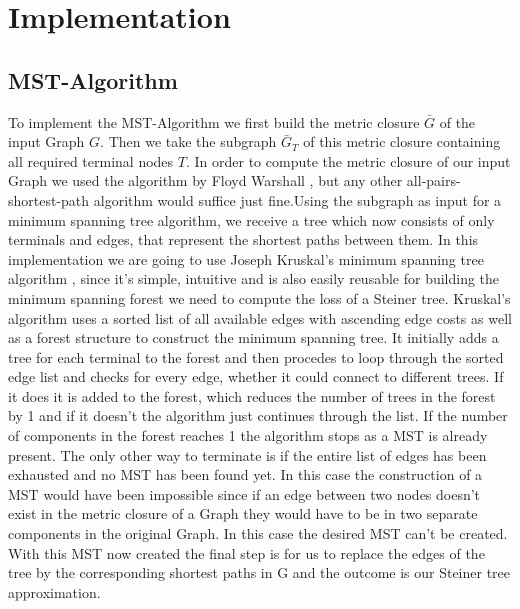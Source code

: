 
\chapter{Implementation}\label{chapter:implementation}



\section{MST-Algorithm}

To implement the MST-Algorithm we first build the metric closure $\bar{G}$ of the input Graph $G$. Then we take the subgraph $\bar{G}_T$ of this metric closure containing all required terminal nodes $T$. In order to compute the metric closure of our input Graph we used the algorithm by Floyd Warshall \cite{hougardy2010floyd}, but any other all-pairs-shortest-path algorithm would suffice just fine.Using the subgraph as input for a minimum spanning tree algorithm, we receive a tree which now consists of only terminals and edges, that represent the shortest paths between them. In this implementation we are going to use Joseph Kruskal's minimum spanning tree algorithm \cite{kruskal1956shortest}, since it's simple, intuitive and is also easily reusable for building the minimum spanning forest we need to compute the loss of a Steiner tree. Kruskal's algorithm uses a sorted list of all available edges with ascending edge costs as well as a forest structure to construct the minimum spanning tree. It initially adds a tree for each terminal to the forest and then procedes to loop through the sorted edge list and checks for every edge, whether it could connect to different trees. If it does it is added to the forest, which reduces the number of trees in the forest by 1 and if it doesn't the algorithm just continues through the list. If the number of components in the forest reaches 1 the algorithm stops as a MST is already present. The only other way to terminate is if the entire list of edges has been exhausted and no MST has been found yet. In this case the construction of a MST would have been impossible since if an edge between two nodes doesn't exist in the metric closure of a Graph they would have to be in two separate components in the original Graph. In this case the desired MST can't be created. With this MST now created the final step is for us to replace the edges of the tree by the corresponding shortest paths in G and the outcome is our Steiner tree approximation.

